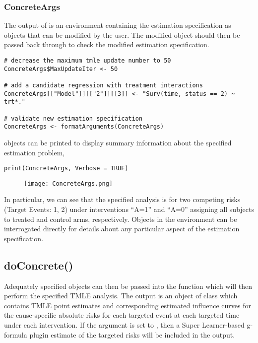 \hypertarget{sec-concreteargs}{%
\subsubsection{ConcreteArgs}\label{sec-concreteargs}}

The  output of  is an environment containing the estimation specification as objects that can be modified by the user. The modified  object should then be passed back through  to check the modified estimation specification.

\begin{verbatim}
# decrease the maximum tmle update number to 50
ConcreteArgs$MaxUpdateIter <- 50

# add a candidate regression with treatment interactions
ConcreteArgs[["Model"]][["2"]][[3]] <- "Surv(time, status == 2) ~ trt*."

# validate new estimation specification
ConcreteArgs <- formatArguments(ConcreteArgs)
\end{verbatim}

 objects can be printed to display summary information about the specified estimation problem,

\begin{verbatim}
print(ConcreteArgs, Verbose = TRUE)
\end{verbatim}

\begin{figure}[H]
\texttt{[image: ConcreteArgs.png]}
\end{figure}

In particular, we can see that the specified analysis is for two competing risks (Target Events: 1, 2) under interventions ``A=1'' and ``A=0'' assigning all subjects to treated and control arms, respectively. Objects in the  environment can be interrogated directly for details about any particular aspect of the estimation specification.

\hypertarget{sec-doConcrete}{%
\subsection{doConcrete()}\label{sec-doConcrete}}

Adequately specified  objects can then be passed into the  function which will then perform the specified TMLE analysis. The output is an object of class  which contains TMLE point estimates and corresponding estimated influence curves for the cause-specific absolute risks for each targeted event at each targeted time under each intervention. If the  argument is set to , then a Super Learner-based g-formula plugin estimate of the targeted risks will be included in the output.


